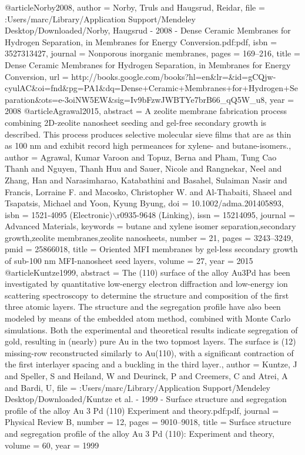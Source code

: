 @article{Norby2008,
author = {Norby, Truls and Haugsrud, Reidar},
file = {:Users/marc/Library/Application Support/Mendeley Desktop/Downloaded/Norby, Haugsrud - 2008 - Dense Ceramic Membranes for Hydrogen Separation, in Membranes for Energy Conversion.pdf:pdf},
isbn = {3527313427},
journal = {Nonporous inorganic membranes},
pages = {169--216},
title = {{Dense Ceramic Membranes for Hydrogen Separation, in Membranes for Energy Conversion}},
url = {http://books.google.com/books?hl=en{\&}lr={\&}id=gCQjw-cyulAC{\&}oi=fnd{\&}pg=PA1{\&}dq=Dense+Ceramic+Membranes+for+Hydrogen+Separation{\&}ots=e-3oiNW5EW{\&}sig=Iv9bFzwJWBTYe7brB66{\_}qQ5W{\_}u8},
year = {2008}
}
@article{Agrawal2015,
abstract = {A zeolite membrane fabrication process combining 2D-zeolite nanosheet seeding and gel-free secondary growth is described. This process produces selective molecular sieve films that are as thin as 100 nm and exhibit record high permeances for xylene- and butane-isomers.},
author = {Agrawal, Kumar Varoon and Topuz, Berna and Pham, Tung Cao Thanh and Nguyen, Thanh Huu and Sauer, Nicole and Rangnekar, Neel and Zhang, Han and Narasimharao, Katabathini and Basahel, Sulaiman Nasir and Francis, Lorraine F. and Macosko, Christopher W. and Al-Thabaiti, Shaeel and Tsapatsis, Michael and Yoon, Kyung Byung},
doi = {10.1002/adma.201405893},
isbn = {1521-4095 (Electronic)$\backslash$r0935-9648 (Linking)},
issn = {15214095},
journal = {Advanced Materials},
keywords = {butane and xylene isomer separation,secondary growth,zeolite membranes,zeolite nanosheets},
number = {21},
pages = {3243--3249},
pmid = {25866018},
title = {{Oriented MFI membranes by gel-less secondary growth of sub-100 nm MFI-nanosheet seed layers}},
volume = {27},
year = {2015}
}
@article{Kuntze1999,
abstract = {The (110) surface of the alloy Au3Pd has been investigated by quantitative low-energy electron diffraction and low-energy ion scattering spectroscopy to determine the structure and composition of the first three atomic layers. The structure and the segregation profile have also been modeled by means of the embedded atom method, combined with Monte Carlo simulations. Both the experimental and theoretical results indicate segregation of gold, resulting in (nearly) pure Au in the two topmost layers. The surface is (12) missing-row reconstructed similarly to Au(110), with a significant contraction of the first interlayer spacing and a buckling in the third layer.},
author = {Kuntze, J and Speller, S and Heiland, W and Deurinck, P and Creemers, C and Atrei, A and Bardi, U},
file = {:Users/marc/Library/Application Support/Mendeley Desktop/Downloaded/Kuntze et al. - 1999 - Surface structure and segregation profile of the alloy Au 3 Pd (110) Experiment and theory.pdf:pdf},
journal = {Physical Review B},
number = {12},
pages = {9010--9018},
title = {{Surface structure and segregation profile of the alloy Au 3 Pd (110): Experiment and theory}},
volume = {60},
year = {1999}
}
